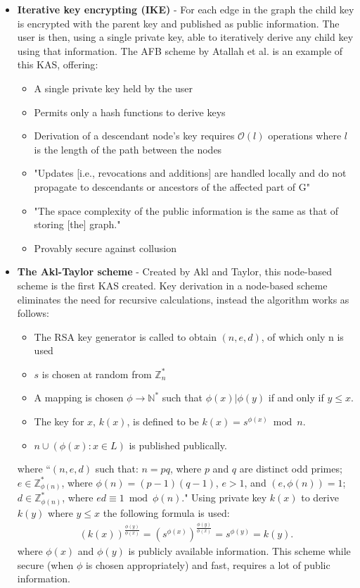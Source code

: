 \documentclass[12pt, titlepage]{article}
\begin{document}
\begin{itemize}
\item \textbf{Iterative key encrypting (IKE)} - For each edge in the graph the child key is encrypted with the parent key and published as public information. The user is then, using a single private key, able to iteratively derive any child key using that information\cite{lazyEncryption}. The AFB scheme by Atallah et al. is an example of this KAS, offering\cite{atallah2005}:
\begin{itemize}
\item A single private key held by the user
\item Permits only a hash functions to derive keys
\item Derivation of a descendant node's key requires $\mathcal{O}(l)$ operations where $l$ is the length of the path between the nodes
\item "Updates [i.e., revocations and additions] are handled locally and do not propagate to descendants or ancestors of the affected part of G"
\item "The space complexity of the public information is the same as that of
storing [the] graph."
\item Provably secure against collusion
\end{itemize}


\item \textbf{The Akl-Taylor scheme} - Created by Akl and Taylor, this node-based scheme is the first KAS created. Key derivation in a node-based scheme eliminates the need for recursive calculations, instead the algorithm works as follows\cite{lazyEncryption}:
\begin{itemize}
\item The RSA key generator is called to obtain $(n, e, d)$, of which only n is used
\item $s$ is chosen at random from $\mathbb{Z}^{*}_{n}$
\item A mapping is chosen $\phi \rightarrow \mathbb{N}^{*}$ such that $\phi(x) | \phi(y)$ if and only if $y≤x$.
\item The key for $x$, $k(x)$, is defined to be $k(x) = s^{ \phi (x)} \bmod n$.
\item ${n} \cup (\phi(x) : x ∈ L)$ is published publically.
\end{itemize}
where ``$(n, e, d)$ such that: $n = pq$, where $p$ and $q$ are distinct odd primes; $e ∈ \mathbb{Z}^{*}_{\phi(n)}$, where $\phi(n) = (p − 1)(q − 1)$, $e > 1$, and $(e, \phi(n)) = 1$; $d ∈ \mathbb{Z}^{*}_{\phi(n)}$, where $ed \equiv 1 \bmod \phi(n)$."
\newline Using private key $k(x)$ to derive $k(y)$ where $y≤x$ the following formula is used:
\begin{align*}
(k(x))^{\frac{\phi(y)}{\phi(x)}} = (s^{\phi(x)})^{\frac{\phi(y)}{\phi(x)}} = s^{\phi(y)} = k(y).
\end{align*}
where $\phi(x)$ and $\phi(y)$ is publicly available information.
\newline \indent This scheme while secure (when $\phi$ is chosen appropriately) and fast, requires a lot of public information.
\end{itemize}
\end{document}
